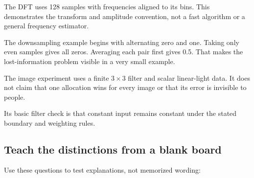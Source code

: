 The DFT uses 128 samples with frequencies aligned to its bins. This demonstrates the transform and amplitude convention, not a fast algorithm or a general frequency estimator.

The downsampling example begins with alternating zero and one. Taking only even samples gives all zeros. Averaging each pair first gives 0.5. That makes the lost-information problem visible in a very small example.

The image experiment uses a finite \(3\times3\) filter and scalar linear-light data. It does not claim that one allocation wins for every image or that its error is invisible to people.

Its basic filter check is that constant input remains constant under the stated boundary and weighting rules.

\subsection{Teach the distinctions from a blank board}\label{04-visual-computing-ii-ch043-teach-the-distinctions-from-a-blank-board}

\hypertarget{04-visual-computing-ii-ch043-teach-the-distinctions-from-a-blank-board}{}

Use these questions to test explanations, not memorized wording:

